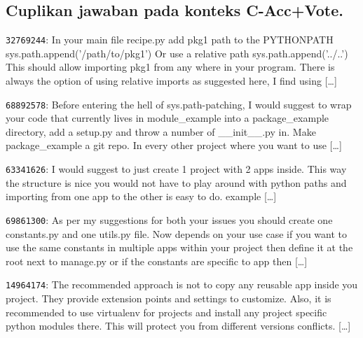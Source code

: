 \subsection{Cuplikan jawaban pada konteks C-Acc+Vote.}
\begin{description}\small
\item[1.] \texttt{32769244}: In your main file recipe.\allowbreak{}py add pkg1 path to the PYTHONPATH sys.\allowbreak{}path.\allowbreak{}append('/\allowbreak{}path/\allowbreak{}to/\allowbreak{}pkg1')\allowbreak{} Or use a relative path sys.\allowbreak{}path.\allowbreak{}append('.\allowbreak{}.\allowbreak{}/\allowbreak{}.\allowbreak{}.\allowbreak{}')\allowbreak{} This should allow importing pkg1 from any where in your program.\allowbreak{} There is always the option of using relative imports as suggested here,\allowbreak{} I find using [\ldots]
\item[2.] \texttt{68892578}: Before entering the hell of sys.\allowbreak{}path-\allowbreak{}patching,\allowbreak{} I would suggest to wrap your code that currently lives in module\_\allowbreak{}example into a package\_\allowbreak{}example directory,\allowbreak{} add a setup.\allowbreak{}py and throw a number of \_\allowbreak{}\_\allowbreak{}init\_\allowbreak{}\_\allowbreak{}.\allowbreak{}py in.\allowbreak{} Make package\_\allowbreak{}example a git repo.\allowbreak{} In every other project where you want to use [\ldots]
\item[3.] \texttt{63341626}: I would suggest to just create 1 project with 2 apps inside.\allowbreak{} This way the structure is nice you would not have to play around with python paths and importing from one app to the other is easy to do.\allowbreak{} example [\ldots]
\item[4.] \texttt{69861300}: As per my suggestions for both your issues you should create one constants.\allowbreak{}py and one utils.\allowbreak{}py file.\allowbreak{} Now depends on your use case if you want to use the same constants in multiple apps within your project then define it at the root next to manage.\allowbreak{}py or if the constants are specific to app then [\ldots]
\item[5.] \texttt{14964174}: The recommended approach is not to copy any reusable app inside you project.\allowbreak{} They provide extension points and settings to customize.\allowbreak{} Also,\allowbreak{} it is recommended to use virtualenv for projects and install any project specific python modules there.\allowbreak{} This will protect you from different versions conflicts.\allowbreak{} [\ldots]
\end{description}

